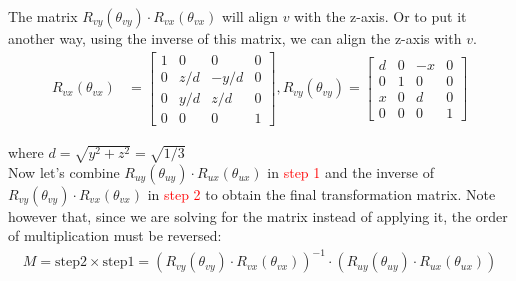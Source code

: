 \documentclass[11pt]{article}  %
\begin{document}
    The matrix $R_{vy}(\theta _{vy}) \cdot R_{vx}(\theta _{vx})$ will align $v$ with the z-axis. Or to put it another way, using the inverse of this matrix, we can align the z-axis with $v$.
    \begin{align*}
        R_{vx}(\theta _{vx}) &= \begin{bmatrix}
            1 &   0   &   0   & 0\\
            0 &  z/d  & -y/d  & 0\\
            0 &  y/d  &  z/d  & 0\\
            0 &   0   &   0   & 1
        \end{bmatrix},
        R_{vy}(\theta _{vy}) = \begin{bmatrix}
            d   &   0   &  -x  & 0\\
            0   &   1   &   0  & 0\\
            x   &   0   &   d  & 0\\
            0   &   0   &   0  & 1
        \end{bmatrix}
    \end{align*}
    
    where $d=\sqrt{y^{2} + z^{2}} = \sqrt{1/3}$\\
    
    Now let's combine $R_{uy}(\theta _{uy}) \cdot R_{ux}(\theta _{ux})$ in \textcolor{red}{step 1} and the inverse of $R_{vy}(\theta _{vy}) \cdot R_{vx}(\theta _{vx})$ in \textcolor{red}{step 2} to obtain the final transformation matrix. Note however that, since we are solving for the matrix instead of applying it, the order of multiplication must be reversed:
    \begin{align*}
        M = \text{step2} \times \text{step1} = (R_{vy}(\theta _{vy}) \cdot R_{vx}(\theta _{vx}))^{-1} \cdot (R_{uy}(\theta _{uy}) \cdot R_{ux}(\theta _{ux}))
    \end{align*}
    
\end{document}
